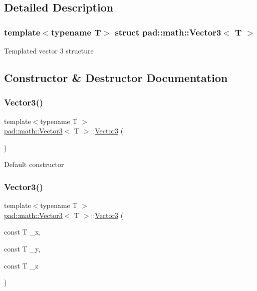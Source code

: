 \subsection{Detailed Description}
\subsubsection*{template$<$typename T$>$\newline
struct pad\+::math\+::\+Vector3$<$ T $>$}

Templated vector 3 structure 

\subsection{Constructor \& Destructor Documentation}
\mbox{\label{structpad_1_1math_1_1_vector3_a06aefc4e209e7e8ab954c9124e9f663f}} 
\subsubsection{\texorpdfstring{Vector3()}{Vector3()}\hspace{0.1cm}{\footnotesize\ttfamily [1/4]}}
{\footnotesize\ttfamily template$<$typename T $>$ \\
\mbox{\hyperlink{structpad_1_1math_1_1_vector3}{pad\+::math\+::\+Vector3}}$<$ T $>$\+::\mbox{\hyperlink{structpad_1_1math_1_1_vector3}{Vector3}} (\begin{DoxyParamCaption}{ }\end{DoxyParamCaption})}

Default constructor \mbox{\label{structpad_1_1math_1_1_vector3_a0770fb886ae92f895ce0258e28a1a1eb}} 
\subsubsection{\texorpdfstring{Vector3()}{Vector3()}\hspace{0.1cm}{\footnotesize\ttfamily [2/4]}}
{\footnotesize\ttfamily template$<$typename T $>$ \\
\mbox{\hyperlink{structpad_1_1math_1_1_vector3}{pad\+::math\+::\+Vector3}}$<$ T $>$\+::\mbox{\hyperlink{structpad_1_1math_1_1_vector3}{Vector3}} (\begin{DoxyParamCaption}\item[{const T}]{\+\_\+x,  }\item[{const T}]{\+\_\+y,  }\item[{const T}]{\+\_\+z }\end{DoxyParamCaption})}

